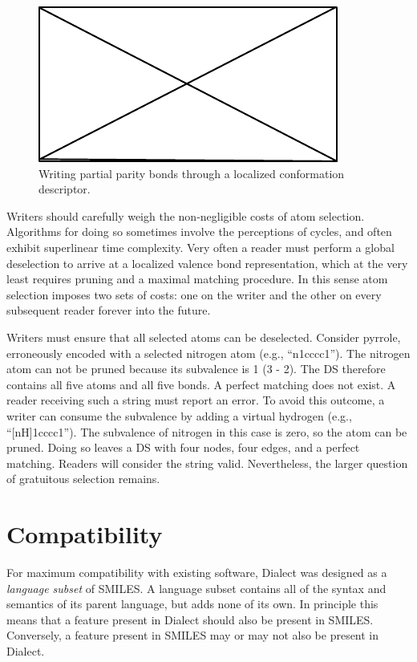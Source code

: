 \documentclass{article}
\begin{document}
\begin{figure}
    \centering
    \includegraphics{filler}
    \caption{Writing partial parity bonds through a localized conformation descriptor.}
    \label{fig:writing-ppb}
\end{figure}

Writers should carefully weigh the non-negligible costs of atom selection. Algorithms for doing so sometimes involve the perceptions of cycles, and often exhibit superlinear time complexity. Very often a reader must perform a global deselection to arrive at a localized valence bond representation, which at the very least requires pruning and a maximal matching procedure. In this sense atom selection imposes two sets of costs: one on the writer and the other on every subsequent reader forever into the future.

Writers must ensure that all selected atoms can be deselected. Consider pyrrole, erroneously encoded with a selected nitrogen atom (e.g., \enquote{n1cccc1}). The nitrogen atom can not be pruned because its subvalence is 1 (3 - 2). The DS therefore contains all five atoms and all five bonds. A perfect matching does not exist. A reader receiving such a string must report an error. To avoid this outcome, a writer can consume the subvalence by adding a virtual hydrogen (e.g., \enquote{[nH]1cccc1}). The subvalence of nitrogen in this case is zero, so the atom can be pruned. Doing so leaves a DS with four nodes, four edges, and a perfect matching. Readers will consider the string valid. Nevertheless, the larger question of gratuitous selection remains.

\section*{Compatibility}

For maximum compatibility with existing software, Dialect was designed as a \textit{language subset} of SMILES. A language subset contains all of the syntax and semantics of its parent language, but adds none of its own. In principle this means that a feature present in Dialect should also be present in SMILES. Conversely, a feature present in SMILES may or may not also be present in Dialect.
\end{document}
